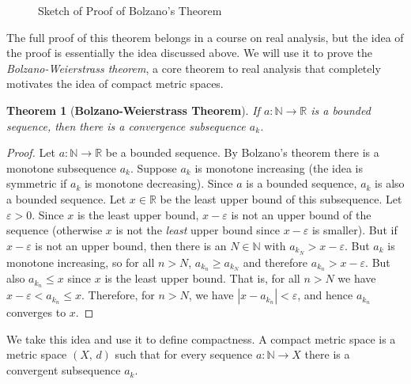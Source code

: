 \documentclass{article}
\theoremstyle{plain}
\newtheorem{theorem}{Theorem}[section]
\theoremstyle{normal}
\newenvironment{definition}{%
    \pushQED{\qed}\renewcommand{\qedsymbol}{$\blacksquare$}\definitionx%
}{%
    \popQED\enddefinitionx%
}
\begin{document}
        \begin{figure}
            \centering
            \caption{Sketch of Proof of Bolzano's Theorem}
            \label{fig:monotone_subsequence_theorem_001}
        \end{figure}
        \par\hfill\par
        The full proof of this theorem belongs in a
        course on real analysis, but the idea of the proof is essentially the
        idea discussed above. We will use it to prove the
        \textit{Bolzano-Weierstrass theorem}, a core theorem to real analysis
        that completely motivates the idea of compact metric spaces.
        \begin{theorem}[\textbf{Bolzano-Weierstrass Theorem}]
            If $a:\mathbb{N}\rightarrow\mathbb{R}$ is a bounded sequence,
            then there is a convergence subsequence $a_{k}$.
        \end{theorem}
        \begin{proof}
            Let $a:\mathbb{N}\rightarrow\mathbb{R}$ be a bounded sequence.
            By Bolzano's theorem there is a monotone subsequence $a_{k}$.
            Suppose $a_{k}$ is monotone increasing (the idea is symmetric if
            $a_{k}$ is monotone decreasing). Since $a$ is a bounded sequence,
            $a_{k}$ is also a bounded sequence. Let $x\in\mathbb{R}$ be the
            least upper bound of this subsequence. Let $\varepsilon>0$. Since
            $x$ is the least upper bound, $x-\varepsilon$ is not an upper
            bound of the sequence (otherwise $x$ is not the \textit{least}
            upper bound since $x-\varepsilon$ is smaller). But if
            $x-\varepsilon$ is not an upper bound, then there is an
            $N\in\mathbb{N}$ with $a_{k_{N}}>x-\varepsilon$. But $a_{k}$
            is monotone increasing, so for all $n>N$, $a_{k_{n}}\geq{a}_{k_{N}}$
            and therefore $a_{k_{n}}>x-\varepsilon$. But also
            $a_{k_{n}}\leq{x}$ since $x$ is the least upper bound. That is,
            for all $n>N$ we have
            $x-\varepsilon<a_{k_{n}}\leq{x}$. Therefore, for $n>N$, we have
            $|x-a_{k_{n}}|<\varepsilon$, and hence $a_{k_{n}}$ converges to $x$.
        \end{proof}
        We take this idea and use it to define compactness.
        \begin{definition}[\textbf{Compact Metric Space}]
            A compact metric space is a metric space $(X,\,d)$ such that
            for every sequence $a:\mathbb{N}\rightarrow{X}$ there is a
            convergent subsequence $a_{k}$.
        \end{definition}
\end{document}
